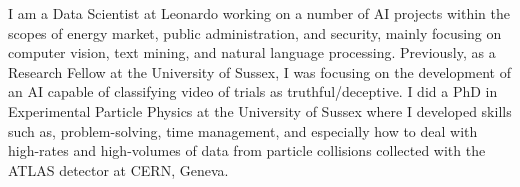 
I am a Data Scientist at Leonardo working on a number of AI projects within the scopes of energy market, public administration, and security, mainly focusing on computer vision, text mining, and natural language processing. Previously, as a Research Fellow at the University of Sussex, I was focusing on the development of an AI capable of classifying video of trials as truthful/deceptive. I did a PhD in Experimental Particle Physics at the University of Sussex where I developed skills such as, problem-solving, time management, and especially how to deal with high-rates and high-volumes of data from particle collisions collected with the ATLAS detector at CERN, Geneva. 


